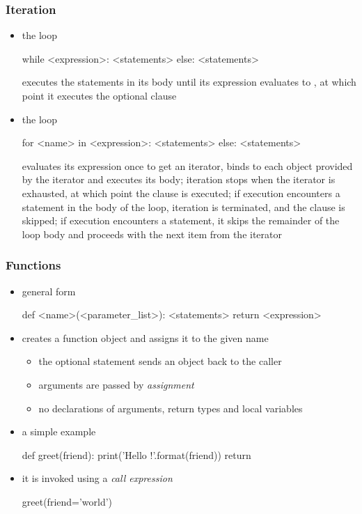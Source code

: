 \begin{frame}[fragile]
%
  \frametitle{Iteration}
%
  \begin{itemize}
%
  \item the  loop
    \begin{ipython}{}
      while <expression>:
          <statements>
      else:
          <statements>
    \end{ipython}
    executes the statements in its body until its expression evaluates to , at
    which point it executes the optional  clause
%
  \item the  loop 
    \begin{ipython}{}
      for <name> in <expression>:
          <statements>
      else:
          <statements>
    \end{ipython}
    evaluates its expression once to get an iterator, binds  to each object
    provided by the iterator and executes its body; iteration stops when the iterator is
    exhausted, at which point the  clause is executed; if execution encounters a
     statement in the body of the loop, iteration is terminated, and the
     clause is skipped; if execution encounters a  statement,
    it skips the remainder of the loop body and proceeds with the next item from the iterator
%
  \end{itemize}
%
\end{frame}

\begin{frame}[fragile]
%
  \frametitle{Functions}
%
  \begin{itemize}
%
  \item general form
    \begin{ipython}{}
      def <name>(<parameter_list>):
          <statements>
          return <expression>
    \end{ipython}
%
  \item creates a function object and assigns it to the given name
    \begin{itemize}
    \item the optional  statement sends an object back to the caller
    \item arguments are passed by \emph{assignment}
    \item no declarations of arguments, return types and local variables
    \end{itemize}
%
  \item a simple example
    \begin{ipython}{}
      def greet(friend):
          print('Hello {}!'.format(friend))
          return
    \end{ipython}
%
  \item it is invoked using a \emph{call expression}
    \begin{ipython}{}
      greet(friend='world')
    \end{ipython}
%
  \end{itemize}
%
\end{frame}

